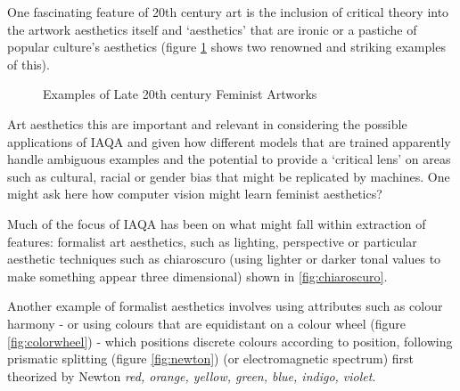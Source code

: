 \par One fascinating feature of 20th century art is the inclusion of critical theory into the artwork aesthetics itself and `aesthetics' that are ironic or a pastiche of popular culture's aesthetics (figure \ref{fig:femnist_art} shows two renowned and striking examples of this). 
\begin{figure}[htp!]
\FloatBarrier
    \centering
    \hfill
    \caption{Examples of Late 20th century Feminist Artworks}
    \label{fig:femnist_art}
\end{figure}
\par Art aesthetics this are important and relevant in considering the possible applications of IAQA and given how different models that are trained apparently handle ambiguous examples and the potential to provide a `critical lens' on areas such as cultural, racial or gender bias that might be replicated by machines. One might ask here how computer vision might learn feminist aesthetics?

\par Much of the focus of IAQA has been on what might fall within extraction of features: formalist art aesthetics, such as lighting, perspective or particular aesthetic techniques such as chiaroscuro (using lighter or darker tonal values to make something appear three dimensional)\cite{Hobbs1990} shown in \ref{fig:chiaroscuro}. 
\par Another example of formalist aesthetics involves using attributes such as colour harmony - or using colours that are equidistant on a colour wheel (figure \ref{fig:colorwheel}) - which positions discrete colours according to position, following prismatic splitting (figure \ref{fig:newton}) (or electromagnetic spectrum) first theorized by Newton \textit{red, orange, yellow, green, blue, indigo, violet}.

